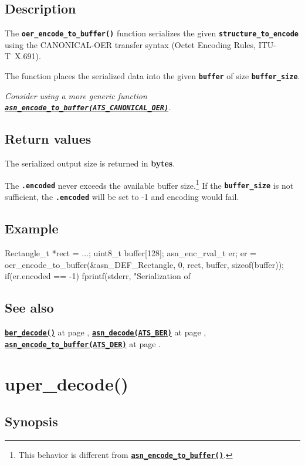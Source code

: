\documentclass[english,oneside,12pt]{book}
\newcommand{\apisection}[2]{\clearpage\section{\label{#1}#2}}
\newcommand{\api}[2]{\hyperref[#1]{\code{#2}}}
\newcommand{\seealso}[2]{\api{#1}{#2} at page \pageref{#1}}
\newcommand{\code}[1]{\texttt{\textbf{\lstinline{#1}}}}
\begin{document}
\subsection*{Description}

The \code{oer_encode_to_buffer()} function serializes the given \code{structure_to_encode} using the CANONICAL-OER transfer syntax (Octet Encoding Rules, ITU-T~X.691).

The function places the serialized data into the given
\code{buffer} of size \code{buffer_size}.\newline

\noindent\emph{Consider using a more generic function \api{sec:asn_encode_to_buffer}{asn_encode_to_buffer(ATS_CANONICAL_OER)}.}

\subsection*{Return values}


The serialized output size is returned in \textbf{bytes}.

The \code{.encoded} never exceeds the available buffer size.\footnote{This
behavior is different from \api{sec:asn_encode_to_buffer}{asn_encode_to_buffer()}.}
If the \code{buffer_size} is not sufficient, the \code{.encoded}
will be set to -1 and encoding would fail.

\subsection*{Example}
\begin{example}
Rectangle_t *rect = ...;
uint8_t buffer[128];
asn_enc_rval_t er;
er = oer_encode_to_buffer(&asn_DEF_Rectangle, 0, rect, buffer, sizeof(buffer));
if(er.encoded == -1) {
   fprintf(stderr, "Serialization of %
}
\end{example}

\subsection*{See also}
\seealso{sec:ber_decode}{ber_decode()},
\seealso{sec:asn_decode}{asn_decode(ATS_BER)},
\seealso{sec:asn_encode_to_buffer}{asn_encode_to_buffer(ATS_DER)}.

\apisection{sec:uper_decode}{uper\_decode()}

\subsection*{Synopsis}
\end{document}
